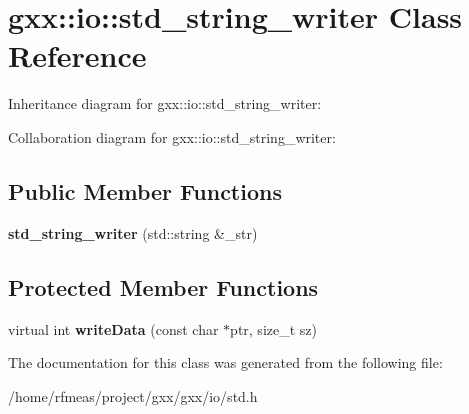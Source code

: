 \hypertarget{classgxx_1_1io_1_1std__string__writer}{}\section{gxx\+:\+:io\+:\+:std\+\_\+string\+\_\+writer Class Reference}
\label{classgxx_1_1io_1_1std__string__writer}


Inheritance diagram for gxx\+:\+:io\+:\+:std\+\_\+string\+\_\+writer\+:


Collaboration diagram for gxx\+:\+:io\+:\+:std\+\_\+string\+\_\+writer\+:
\subsection*{Public Member Functions}
\begin{DoxyCompactItemize}
\item 
{\bfseries std\+\_\+string\+\_\+writer} (std\+::string \&\+\_\+str)\hypertarget{classgxx_1_1io_1_1std__string__writer_a59c75c37207497f6471b10e4d4d47dbb}{}\label{classgxx_1_1io_1_1std__string__writer_a59c75c37207497f6471b10e4d4d47dbb}

\end{DoxyCompactItemize}
\subsection*{Protected Member Functions}
\begin{DoxyCompactItemize}
\item 
virtual int {\bfseries write\+Data} (const char $\ast$ptr, size\+\_\+t sz)\hypertarget{classgxx_1_1io_1_1std__string__writer_ab9f4212394c895830f31ad0fad9ebde5}{}\label{classgxx_1_1io_1_1std__string__writer_ab9f4212394c895830f31ad0fad9ebde5}

\end{DoxyCompactItemize}


The documentation for this class was generated from the following file\+:\begin{DoxyCompactItemize}
\item 
/home/rfmeas/project/gxx/gxx/io/std.\+h\end{DoxyCompactItemize}
